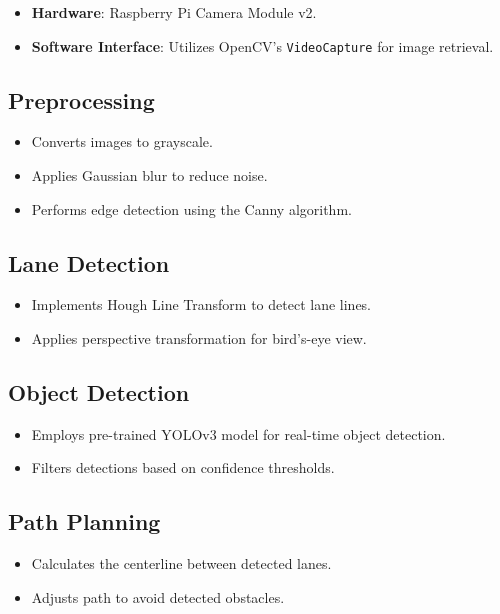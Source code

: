 \documentclass[12pt]{article}
\begin{document}
\begin{itemize}[leftmargin=*, label={--}]
  \item \textbf{Hardware}: Raspberry Pi Camera Module v2.
  \item \textbf{Software Interface}: Utilizes OpenCV's \texttt{VideoCapture} for image retrieval.
\end{itemize}

\subsection{Preprocessing}

\begin{itemize}[leftmargin=*, label={--}]
  \item Converts images to grayscale.
  \item Applies Gaussian blur to reduce noise.
  \item Performs edge detection using the Canny algorithm.
\end{itemize}

\subsection{Lane Detection}

\begin{itemize}[leftmargin=*, label={--}]
  \item Implements Hough Line Transform to detect lane lines.
  \item Applies perspective transformation for bird's-eye view.
\end{itemize}

\subsection{Object Detection}

\begin{itemize}[leftmargin=*, label={--}]
  \item Employs pre-trained YOLOv3 model for real-time object detection.
  \item Filters detections based on confidence thresholds.
\end{itemize}

\subsection{Path Planning}

\begin{itemize}[leftmargin=*, label={--}]
  \item Calculates the centerline between detected lanes.
  \item Adjusts path to avoid detected obstacles.
\end{itemize}
\end{document}
